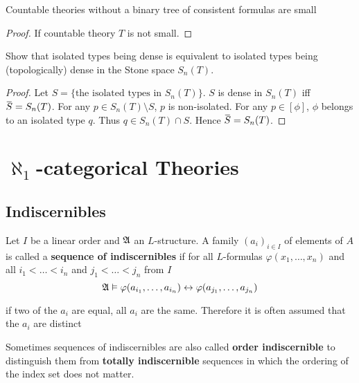 \documentclass[11pt]{article}
\begin{document}
\begin{exercise}
Countable theories without a binary tree of consistent formulas are small
\end{exercise}

\begin{proof}
If countable theory \(T\) is not small.
\end{proof}

\begin{exercise}
\label{ex4.5.2}
Show that isolated types being dense is equivalent to isolated types being (topologically) dense
in the Stone space \(S_n(T)\).
\end{exercise}

\begin{proof}
Let \(S=\{\text{the isolated types in }S_n(T)\}\). \(S\) is dense in \(S_n(T)\)
iff \(\barS=S_n(T)\). For any \(p\in S_n(T)\setminus S\), \(p\) is non-isolated. For any \(p\in[\phi]\), \(\phi\)
belongs to an isolated type \(q\). Thus \(q\in S_n(T)\cap S\). Hence \(\barS=S_n(T)\).
\end{proof}



\section{\texorpdfstring{\(\aleph_1\)}{ℵ₁}-categorical Theories}
\label{sec:org90320db}

\subsection{Indiscernibles}
\label{sec:orgb522de2}
\begin{definition}[]
Let \(I\) be a linear order and \(\mathfrak{A}\) an \(L\)-structure. A family \((a_i)_{i\in I}\) of elements
of \(A\) is called a \textbf{sequence of indiscernibles}  if for all \(L\)-formulas \(\varphi(x_1,\dots,x_n)\) and
all \(i_1<\dots<i_n\) and \(j_1<\dots<j_n\) from \(I\)
\begin{equation*}
\mathfrak{A}\vDash\varphi(a_{i_1},\dots,a_{i_n})\leftrightarrow\varphi(a_{j_1},\dots,a_{j_n})
\end{equation*}
\end{definition}

if two of the \(a_i\) are equal, all \(a_i\) are the same. Therefore it is often assumed that
the \(a_i\) are distinct

Sometimes sequences of indiscernibles are also called \textbf{order indiscernible} to distinguish them
from \textbf{totally indiscernible} sequences in which the ordering of the index set does not matter.
\end{document}
